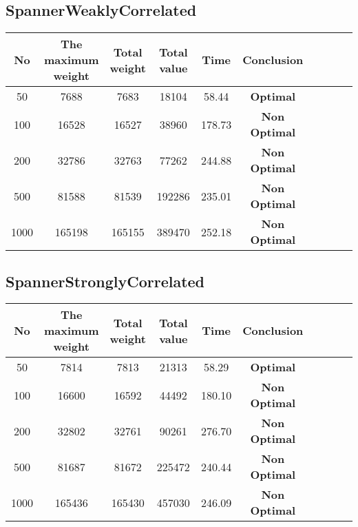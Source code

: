 \documentclass{article}
\begin{document}
\subsection{SpannerWeaklyCorrelated}
    \begin{center}
        \begin{tabular}{|c|c| c|c| c|c| c|c| c|c|}
        \hline
            No& The maximum weight & Total weight & Total value& Time&Conclusion \\
        \hline
            50 & 7688 & 7683 & 18104 & 58.44 & \textbf{Optimal}\\
            100 & 16528 & 16527 & 38960 & 178.73 & \textbf{Non Optimal}\\
            200 & 32786 & 32763 & 77262 & 244.88 & \textbf{Non Optimal}\\
            500 & 81588 & 81539 & 192286 & 235.01 & \textbf{Non Optimal}\\
            1000 & 165198 & 165155 & 389470 & 252.18 & \textbf{Non Optimal}\\
    \hline
        \hline 
        \end{tabular}
    \end{center}
\subsection{SpannerStronglyCorrelated}
    \begin{center}
        \begin{tabular}{|c|c| c|c| c|c| c|c| c|c|}
        \hline
            No& The maximum weight & Total weight & Total value& Time&Conclusion \\
        \hline
            50 & 7814 & 7813 & 21313 & 58.29 & \textbf{Optimal}\\
            100 & 16600 & 16592 & 44492 & 180.10 & \textbf{Non Optimal}\\
            200 & 32802 & 32761 & 90261 & 276.70 & \textbf{Non Optimal}\\
            500 & 81687 & 81672 & 225472 & 240.44 & \textbf{Non Optimal}\\
            1000 & 165436 & 165430 & 457030 & 246.09 & \textbf{Non Optimal}\\
    \hline
        \hline 
        \end{tabular}
    \end{center}
\end{document}
